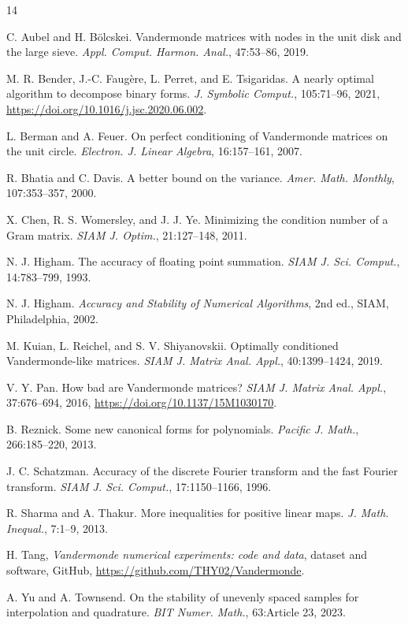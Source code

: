 \documentclass[10pt,twoside,final]{siamart1116}
\numberwithin{equation}{section}
\numberwithin{theorem}{section}
\begin{document}
\begin{thebibliography}{14}

C. Aubel and H. B\"olcskei.
Vandermonde matrices with nodes in the
unit disk and the large sieve.
\emph{Appl. Comput. Harmon. Anal.}, 47:53--86, 2019.

M. R. Bender, J.-C. Faug\`ere, L. Perret, and E. Tsigaridas.
A nearly optimal algorithm to decompose binary forms.
\emph{J. Symbolic Comput.}, 105:71--96, 2021, \url{https://doi.org/10.1016/j.jsc.2020.06.002}.

L. Berman and A. Feuer.
On perfect conditioning of Vandermonde
matrices on the unit circle.
\emph{Electron. J. Linear Algebra}, 16:157--161, 2007.

R. Bhatia and C. Davis.
A better bound on the variance.
\emph{Amer. Math. Monthly}, 107:353--357, 2000.

X. Chen, R. S. Womersley, and J. J. Ye.
Minimizing the condition
number of a Gram matrix.
\emph{SIAM J. Optim.}, 21:127--148, 2011.

N. J. Higham.
The accuracy of floating point summation.
\emph{SIAM J. Sci. Comput.}, 14:783--799, 1993.

N. J. Higham.
\emph{Accuracy and Stability of Numerical Algorithms},
2nd ed., SIAM, Philadelphia, 2002.

M. Kuian, L. Reichel, and S. V. Shiyanovskii.
Optimally conditioned
Vandermonde-like matrices.
\emph{SIAM J. Matrix Anal. Appl.}, 40:1399--1424, 2019.

V. Y. Pan.
How bad are Vandermonde matrices?
\emph{SIAM J. Matrix
Anal. Appl.}, 37:676--694, 2016, \url{https://doi.org/10.1137/15M1030170}.

B. Reznick.
Some new canonical forms for polynomials.
\emph{Pacific J. Math.}, 266:185--220, 2013.

J. C. Schatzman.
Accuracy of the discrete Fourier transform and the
fast Fourier transform.
\emph{SIAM J. Sci. Comput.}, 17:1150--1166, 1996.

R. Sharma and A. Thakur.
More inequalities for positive linear maps.
\emph{J. Math. Inequal.}, 7:1--9, 2013.

H. Tang,
\emph{Vandermonde numerical experiments: code and data}, dataset and software,
GitHub, \url{https://github.com/THY02/Vandermonde}.

A. Yu and A. Townsend.
On the stability of unevenly spaced samples
for interpolation and quadrature. \emph{BIT Numer. Math.}, 63:Article 23, 2023.

\end{thebibliography}
\end{document}
